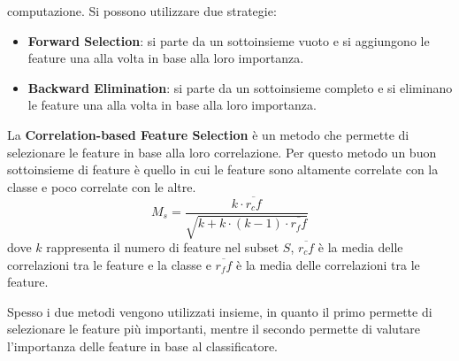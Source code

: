 \begin{itemize}
            computazione. Si possono utilizzare due strategie:
            \begin{itemize}
                  \item \textbf{Forward Selection}: si parte da un sottoinsieme
                        vuoto e si aggiungono le feature una alla volta in base
                        alla loro importanza.
                  \item \textbf{Backward Elimination}: si parte da un sottoinsieme
                        completo e si eliminano le feature una alla volta in base
                        alla loro importanza.
            \end{itemize}
\end{itemize}

La \textbf{Correlation-based Feature Selection} è un metodo che permette di
selezionare le feature in base alla loro correlazione. Per questo metodo un 
buon sottoinsieme di feature è quello in cui le feature sono altamente correlate
con la classe e poco correlate con le altre. 
\begin{equation}
      M_s = \frac{k \cdot \overline{r_cf}}{\sqrt{k + k \cdot (k - 1) \cdot \overline{r_ff}}}
\end{equation}
dove $k$ rappresenta il numero di feature nel subset $S$, $\overline{r_cf}$ è la
media delle correlazioni tra le feature e la classe e $\overline{r_ff}$ è la media
delle correlazioni tra le feature.

Spesso i due metodi vengono utilizzati insieme, in quanto il primo permette di
selezionare le feature più importanti, mentre il secondo permette di valutare
l'importanza delle feature in base al classificatore.